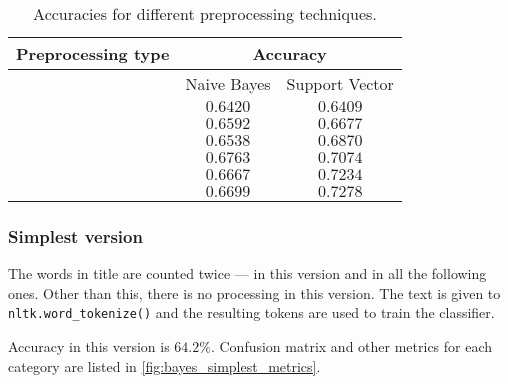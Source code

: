 \begin{table}[ht]
    \centering
    \caption{Accuracies for different preprocessing techniques.}
    \label{tab:bayes_table}
    \vspace{1em}
    \begin{tabular}[htpb]{c|c|c}
        Preprocessing type             & \multicolumn{2}{c}{Accuracy} \\
        \hline
                                       &
        Naive Bayes
                                       & Support Vector               \\
        \hline\hline
        \nameref{sec:bayes_simple}
                                       & $0.6420$
                                       & $0.6409$                     \\
        \hline
        \nameref{sec:bayes_lowercase}
                                       & $0.6592$
                                       & $0.6677$                     \\
        \hline
        \nameref{sec:bayes_punctuation}
                                       & $0.6538$
                                       & $0.6870$                     \\
        \hline
        \nameref{sec:bayes_stopwords}
                                       & $0.6763$
                                       & $0.7074$                     \\
        \hline
        \nameref{sec:bayes_stemming}   & $0.6667$
                                       & $0.7234$                     \\
        \hline
        \nameref{sec:bayes_shortwords} & $0.6699$
                                       & $0.7278$                     \\
    \end{tabular}
\end{table}

\subsubsection{Simplest version}
\label{sec:bayes_simple}

The words in title are counted twice --- in this version and in all the following ones. Other than this, there is no processing in this version. The text is given to \texttt{nltk.word_tokenize()} and the resulting tokens are used to train the classifier.

Accuracy in this version is $64.2\%$. Confusion matrix and other metrics for each category are listed in \autoref{fig:bayes_simplest_metrics}.

